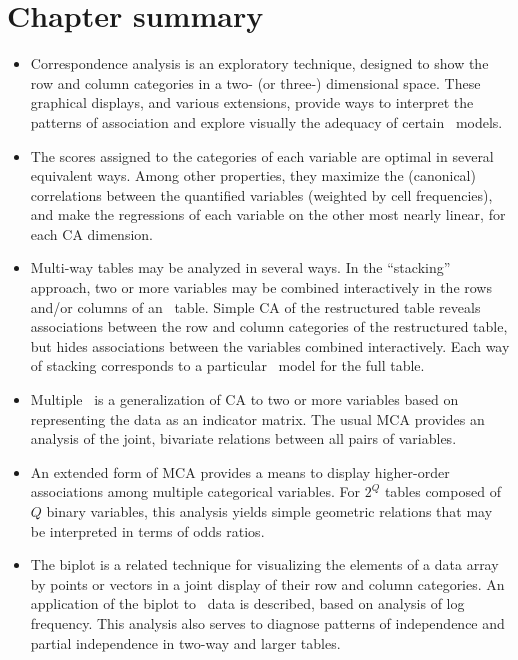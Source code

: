 




\section{Chapter summary}
\begin{itemize}
\item Correspondence analysis is an exploratory technique, designed to
show the row and column categories in a two- (or three-) dimensional
space.  These graphical displays, and various extensions, provide
ways to interpret the patterns of association and explore visually
the adequacy of certain \loglin\ models.

\item The scores assigned to the categories of each variable are optimal
in several equivalent ways.
Among other properties,
they maximize the (canonical) correlations between the quantified
variables (weighted by cell frequencies), and make the regressions
of each variable on the other most nearly linear, for each CA dimension.

\item Multi-way tables may be analyzed in several ways.
In the ``stacking'' approach, two or more variables may be combined
interactively in the rows and/or columns of an \nway\ table.
Simple CA of the restructured table reveals associations between
the row and column categories of the restructured table,
but hides associations between the variables combined interactively.
Each way of stacking corresponds to a particular \loglin\ model
for the full table.

\item Multiple \CA\ is a generalization of CA to two or more variables
based on representing the data as an indicator matrix.
The usual MCA provides an analysis of the joint, bivariate relations
between all pairs of variables.

\item An extended form of MCA provides a means to display higher-order
associations among multiple categorical variables.
For $2^Q$ tables composed of $Q$ binary variables, this analysis yields
simple geometric relations that may be interpreted in terms of odds ratios.

\item The biplot is a related technique for visualizing the elements of
a data array by points or vectors in a joint display of their row and
column categories.
An application of the biplot to \ctab\ data is described, based on analysis
of log frequency.
This analysis also serves to diagnose patterns of independence and
partial independence in two-way and larger tables.
\end{itemize}
